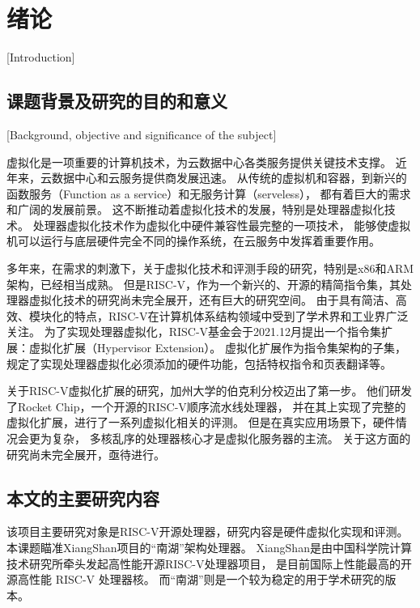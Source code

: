 
\chapter{绪论}[Introduction]

\section{课题背景及研究的目的和意义}[Background, objective and significance of the subject]

虚拟化是一项重要的计算机技术，为云数据中心各类服务提供关键技术支撑。
近年来，云数据中心和云服务提供商发展迅速。
从传统的虚拟机和容器，到新兴的函数服务（Function as a service）和无服务计算（serveless），
都有着巨大的需求和广阔的发展前景。
这不断推动着虚拟化技术的发展，特别是处理器虚拟化技术。
处理器虚拟化技术作为虚拟化中硬件兼容性最完整的一项技术，
能够使虚拟机可以运行与底层硬件完全不同的操作系统，在云服务中发挥着重要作用。

多年来，在需求的刺激下，关于虚拟化技术和评测手段的研究，特别是x86和ARM架构，已经相当成熟。
但是RISC-V，作为一个新兴的、开源的精简指令集，其处理器虚拟化技术的研究尚未完全展开，还有巨大的研究空间。
由于具有简洁、高效、模块化的特点，RISC-V在计算机体系结构领域中受到了学术界和工业界广泛关注。
为了实现处理器虚拟化，RISC-V基金会于2021.12月提出一个指令集扩展：虚拟化扩展（Hypervisor Extension）。
虚拟化扩展作为指令集架构的子集，规定了实现处理器虚拟化必须添加的硬件功能，包括特权指令和页表翻译等。

关于RISC-V虚拟化扩展的研究，加州大学的伯克利分校迈出了第一步。
他们研发了Rocket Chip，一个开源的RISC-V顺序流水线处理器，
并在其上实现了完整的虚拟化扩展，进行了一系列虚拟化相关的评测。
但是在真实应用场景下，硬件情况会更为复杂，
多核乱序的处理器核心才是虚拟化服务器的主流。
关于这方面的研究尚未完全展开，亟待进行。



\section{本文的主要研究内容}
该项目主要研究对象是RISC-V开源处理器，研究内容是硬件虚拟化实现和评测。
本课题瞄准XiangShan项目的“南湖”架构处理器。
XiangShan是由中国科学院计算技术研究所牵头发起高性能开源RISC-V处理器项目，
是目前国际上性能最高的开源高性能 RISC-V 处理器核。
而“南湖”则是一个较为稳定的用于学术研究的版本。